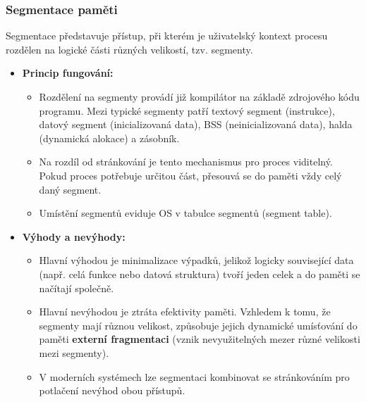     \subsubsection{Segmentace paměti}
        Segmentace představuje přístup, při kterém je uživatelský kontext procesu rozdělen na logické části různých velikostí, tzv. segmenty.
        \begin{itemize}
            \item \textbf{Princip fungování:}
            \begin{itemize}
                \item Rozdělení na segmenty provádí již kompilátor na základě zdrojového kódu programu. Mezi typické segmenty patří textový segment (instrukce), datový segment (inicializovaná data), BSS (neinicializovaná data), halda (dynamická alokace) a zásobník.
                \item Na rozdíl od stránkování je tento mechanismus pro proces viditelný. Pokud proces potřebuje určitou část, přesouvá se do paměti vždy celý daný segment.
                \item Umístění segmentů eviduje OS v tabulce segmentů (segment table).
            \end{itemize}
        
            \item \textbf{Výhody a nevýhody:}
            \begin{itemize}
                \item Hlavní výhodou je minimalizace výpadků, jelikož logicky související data (např. celá funkce nebo datová struktura) tvoří jeden celek a do paměti se načítají společně.
                \item Hlavní nevýhodou je ztráta efektivity paměti. Vzhledem k tomu, že segmenty mají různou velikost, způsobuje jejich dynamické umísťování do paměti \textbf{externí fragmentaci} (vznik nevyužitelných mezer různé velikosti mezi segmenty).
                \item V moderních systémech lze segmentaci kombinovat se stránkováním pro potlačení nevýhod obou přístupů.
            \end{itemize}
        \end{itemize}
